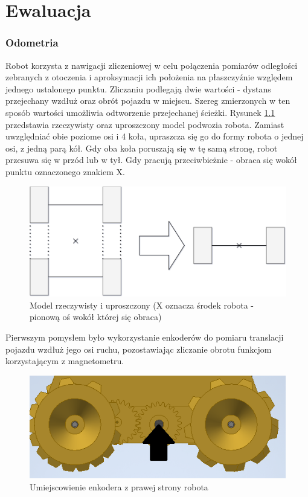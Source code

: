 \chapter{Ewaluacja}

\subsection{Odometria}
\label{sec:odometry}
Robot korzysta z nawigacji zliczeniowej w celu połączenia pomiarów odległości zebranych z otoczenia i aproksymacji ich położenia na płaszczyźnie względem jednego ustalonego punktu. Zliczaniu podlegają dwie wartości - dystans przejechany wzdłuż oraz obrót pojazdu w miejscu. Szereg zmierzonych w ten sposób wartości umożliwia odtworzenie przejechanej ścieżki. Rysunek \ref{fig:odom-axis-simplified} przedstawia rzeczywisty oraz uproszczony model podwozia robota. Zamiast uwzględniać obie poziome osi i 4 koła, upraszcza się go do formy robota o jednej osi, z jedną parą kół. Gdy oba koła poruszają się w tę samą stronę, robot przesuwa się w przód lub w tył. Gdy pracują przeciwbieżnie - obraca się wokół punktu oznaczonego znakiem X.

\begin{figure}[H]
	\centering
		\includegraphics[width=0.6\linewidth]{rys/robot-odometry-simplified.pdf}
	\caption{Model rzeczywisty i uproszczony (X oznacza środek robota - pionową oś wokół której się obraca)}
	\label{fig:odom-axis-simplified}
\end{figure}


Pierwszym pomysłem było wykorzystanie enkoderów do pomiaru translacji pojazdu wzdłuż jego osi ruchu, pozostawiając zliczanie obrotu funkcjom korzystającym z magnetometru.

\begin{figure}[H]
	\centering
		\includegraphics[width=0.5\linewidth]{rys/encoder-position.png}
	\caption{Umiejscowienie enkodera z prawej strony robota}
	\label{fig:encoder-pos}
\end{figure}

